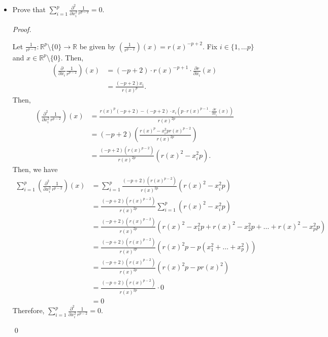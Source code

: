 \documentclass[12pt]{article}
\newenvironment{problem}[2][Problem]{\begin{trivlist}
\item[\hskip \labelsep {\bfseries #1}\hskip \labelsep {\bfseries
#2.}]}{\end{trivlist}}
\newenvironment{sol}
    {\emph{Proof.}
    }
    {
    \qed
    }
\begin{document}
\begin{problem}{13}
\begin{itemize}
      \item[(c)] Prove that $\sum_{i = 1}^p \frac{\partial^2}{\partial x_i^2}\frac{1}{r^{p-2}} = 0$.
      
      \begin{sol}
      Let $\frac{1}{r^{p-2}} : \mathbb{R}^p \setminus \{0\} \to \mathbb{R}$ be given by $\left(\frac{1}{r^{p-2}}\right)(x) = r(x)^{-p+2}$. Fix $i \in \{1, \dots p\}$ and $x \in \mathbb{R}^p \setminus \{0\}$. Then, \begin{align*}
         \left(\frac{\partial}{\partial x_i}\frac{1}{r^{p-2}}\right)(x) &= (-p+2)\cdot r(x)^{-p+1}\cdot \frac{\partial r}{\partial x_i}(x) \tag*{(By chain rule)} \\ &= \frac{(-p+2)x_i}{r(x)^p}.
      \end{align*}
      Then, \begin{align*}
         \left(\frac{\partial^2}{\partial x_i^2}\frac{1}{r^{p-2}}\right)(x) &= \frac{r(x)^p(-p+2) - (-p+2) \cdot x_i(p \cdot r(x)^{p-1}\cdot \frac{\partial r}{\partial x_i}(x))}{r(x)^{2p}} \tag*{(By quotient rule)} \\ &= (-p+2) \left( \frac{r(x)^p - x_i^2pr(x)^{p-2}}{r(x)^{2p}} \right) \\ &= \frac{(-p+2)(r(x)^{p-2})}{r(x)^{2p}}(r(x)^2-x_i^2p).
      \end{align*}
      Then, we have \begin{align*}
          \sum_{i = 1}^p\left(\frac{\partial^2}{\partial x_i^2}\frac{1}{r^{p-2}}\right)(x) &= \sum_{i = 1}^p\frac{(-p+2)(r(x)^{p-2})}{r(x)^{2p}}(r(x)^2-x_i^2p) \\ &= \frac{(-p+2)(r(x)^{p-2})}{r(x)^{2p}}\sum_{i = 1}^p (r(x)^2 - x_i^2p) \tag*{(Summation property)} \\ &= \frac{(-p+2)(r(x)^{p-2})}{r(x)^{2p}} (r(x)^2 - x_1^2p + r(x)^2 - x_2^2p + \dots + r(x)^2 - x_p^2p) \\ &= \frac{(-p+2)(r(x)^{p-2})}{r(x)^{2p}}(r(x)^2p - p(x_1^2 + \dots + x_p^2)) \\ &= \frac{(-p+2)(r(x)^{p-2})}{r(x)^{2p}}(r(x)^2p - pr(x)^2) \\ &= \frac{(-p+2)(r(x)^{p-2})}{r(x)^{2p}} \cdot 0 \\ &= 0
      \end{align*}
      Therefore, $\sum_{i = 1}^p \frac{\partial^2}{\partial x_i^2}\frac{1}{r^{p-2}} = 0$.
      \end{sol}
  \end{itemize}
  \end{problem}
  
\end{document}
